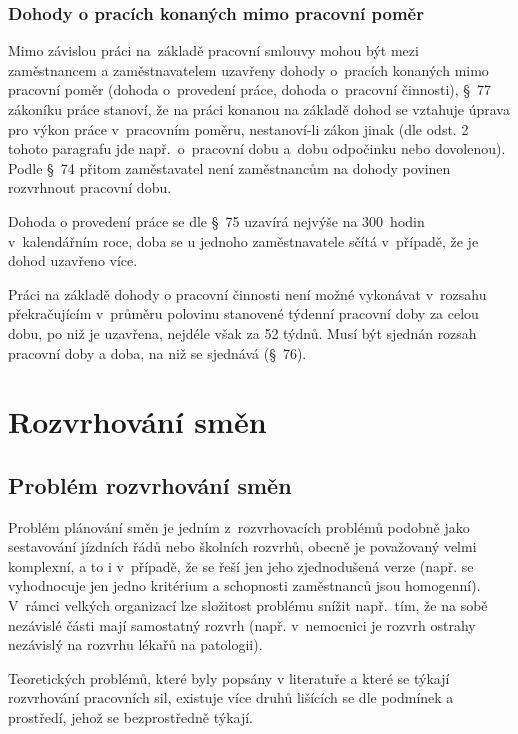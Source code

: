 \documentclass[twoside]{ctuthesis}
\begin{document}
\subsection{Dohody o pracích konaných mimo pracovní poměr}
Mimo závislou práci na~základě pracovní smlouvy mohou být mezi zaměstnancem a zaměstnavatelem uzavřeny dohody o~pracích konaných mimo pracovní poměr (dohoda o~provedení práce, dohoda o~pracovní činnosti), §~77 zákoníku práce stanoví, že na práci konanou na základě dohod se vztahuje úprava pro výkon práce v~pracovním poměru, nestanoví-li zákon jinak (dle odst. 2 tohoto paragrafu jde např.~o~pracovní dobu a~dobu odpočinku nebo dovolenou). Podle §~74 přitom zaměstavatel není zaměstnancům na dohody povinen rozvrhnout pracovní dobu.

Dohoda o provedení práce se dle §~75 uzavírá nejvýše na 300~hodin v~kalendářním roce, doba se u jednoho zaměstnavatele sčítá v~případě, že je dohod uzavřeno více.

Práci na základě dohody o pracovní činnosti není možné vykonávat v~rozsahu překračujícím v~průměru polovinu stanovené týdenní pracovní doby za celou dobu, po niž je uzavřena, nejdéle však za 52 týdnů. Musí být sjednán rozsah pracovní doby a doba, na niž se sjednává (§~76).

\chapter{Rozvrhování směn}
\section{Problém rozvrhování směn}

Problém plánování směn je jedním z~rozvrhovacích problémů podobně jako sestavování jízdních řádů nebo školních rozvrhů, obecně je považovaný velmi komplexní, a to i v~případě, že se řeší jen jeho zjednodušená verze (např. se vyhodnocuje jen jedno kritérium a schopnosti zaměstnanců jsou homogenní). V~rámci velkých organizací lze složitost problému snížit např.~tím, že na sobě nezávislé části mají samostatný rozvrh (např. v~nemocnici je rozvrh ostrahy nezávislý na rozvrhu lékařů na patologii).

Teoretických problémů, které byly popsány v literatuře a které se týkají rozvrhování pracovních sil, existuje více druhů lišících se dle podmínek a prostředí, jehož se bezprostředně týkají.

\end{document}
